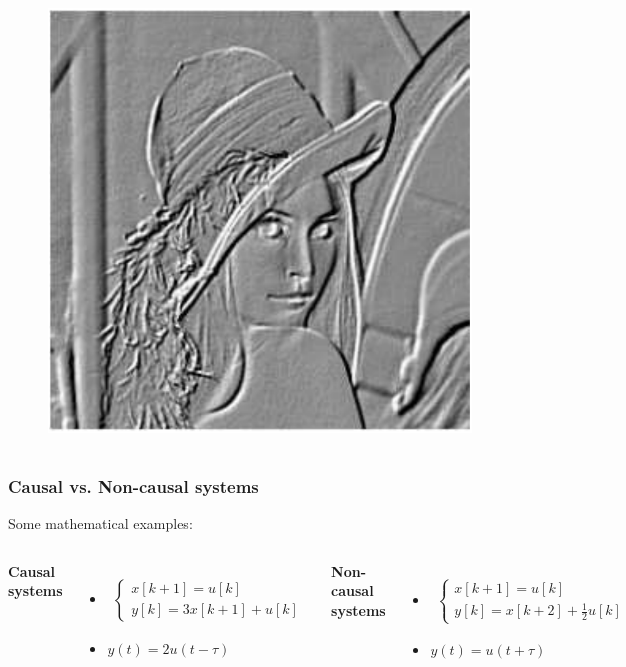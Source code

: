 \documentclass{beamer}
\begin{document}
\begin{frame}
\begin{columns}
\begin{figure}
\includegraphics[width=.5\linewidth]{highlight}
\end{figure}
\vspace{-4ex}

\end{columns}
\end{frame}


\begin{frame}
\frametitle{Causal vs. Non-causal systems}
\vspace{-6ex}
Some mathematical examples:\\
\bigskip
\begin{columns}
\textbf{Causal systems}\\
\begin{itemize}
\item \begin{align*}
\begin{cases}
x[k+1] = u[k]\\
y[k] = 3 x [k+1] + u[k]
\end{cases}
\end{align*}
\item $y(t) = 2 u(t-\tau)$
\end{itemize}

\textbf{Non-causal systems}\\
\begin{itemize}
\item \begin{align*}
\begin{cases}
x[k+1] = u[k]\\
y[k] = x[k+2] + \frac{1}{2}u[k]
\end{cases}
\end{align*}
\item $y(t) = u(t + \tau)$
\end{itemize}

\end{columns}
\end{frame}
\end{document}
